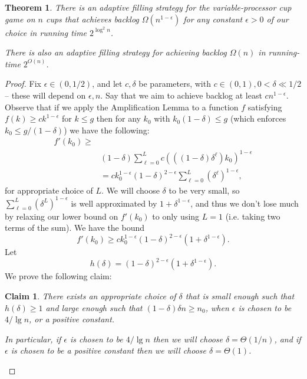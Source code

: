 \documentclass[twocolumn]{article}[10pt]
\newtheorem{clm}{Claim}
\newtheorem{theorem}{Theorem}
\begin{document}
\begin{theorem}
  \label{thm:adaptivePoly}
  There is an adaptive filling strategy for the variable-processor cup game on
  $n$ cups that achieves backlog $\Omega(n^{1-\epsilon})$ for any constant
  $\epsilon > 0$ of our choice in running time $2^{\log^2 n}$.

  There is also an adaptive filling strategy for achieving backlog $\Omega(n)$ in running-time $2^{O(n)}$.
\end{theorem}
\begin{proof}
  Fix $\epsilon \in (0,1/2)$, and let $c, \delta$ be parameters, with $c\in
  (0,1), 0 < \delta \ll 1/2$ -- these will depend on $\epsilon, n$.
  Say that we aim to achieve backlog at least $cn^{1-\epsilon}$.
  Observe that if we apply the Amplification Lemma to a function $f$ satisfying
  $f(k) \ge ck^{1-\epsilon}$ for $k \le g$ then for any $k_0$ with
  $k_0(1-\delta)\le g$ (which enforces $k_0 \le g/ (1-\delta)$) we have the
  following:
  \begin{align*}
  f'(k_0)\ge&\\
  &(1-\delta)\sum_{\ell=0}^L c (((1-\delta)\delta^\ell)k_0)^{1-\epsilon}\\
  &= ck_0^{1-\epsilon} (1-\delta)^{2-\epsilon} \sum_{\ell=0}^L (\delta^\ell)^{1-\epsilon},
  \end{align*}
  for appropriate choice of $L$.
  We will choose $\delta$ to be very small, so $\sum_{\ell=0}^L
  (\delta^L)^{1-\epsilon}$ is well approximated by
  $1+\delta^{1-\epsilon}$, and thus we don't lose much by relaxing our lower
  bound on $f'(k_0)$ to only using $L=1$ (i.e. taking two terms of the sum). We have the bound
  $$f'(k_0) \ge ck_0^{1-\epsilon}(1-\delta)^{2-\epsilon}(1+\delta^{1-\epsilon}).$$
  Let 
  $$h(\delta) = (1-\delta)^{2-\epsilon}(1+\delta^{1-\epsilon}).$$
  We prove the following claim:

  \begin{clm}
    \label{clm:validchoices}
    There exists an appropriate choice of $\delta$ that is small enough such
    that $h(\delta) \ge 1$ and large enough such that $(1-\delta)\delta n \ge
    n_0$, when $\epsilon$ is chosen to be $4/\lg n$, or a positive constant. 

    In particular, if $\epsilon$ is chosen to be $4/\lg n$ then we will choose
    $\delta =\Theta(1/n)$, and if $\epsilon$ is chosen to be a positive
    constant then we will choose $\delta = \Theta(1)$.
  \end{clm}


\end{proof}
\end{document}
